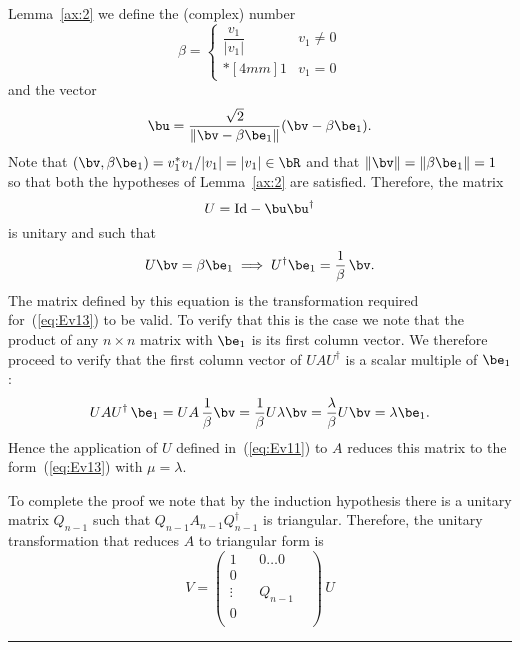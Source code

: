 Lemma~\ref{ax:2} we define the (complex) number
%
\begin{equation*}
  \beta =
  \begin{cases}
    \dfrac{v_1}{|v_1|} & v_1 \neq 0 \\*[4mm] 1 & v_1 = 0
  \end{cases}
\end{equation*}
%
and the vector
%
\begin{equation*}
  \bu = \frac{\sqrt{2}}{\|\bv - \beta \be_1\|} (\bv - \beta \be_1) .
\end{equation*}
%
Note that $(\bv, \beta \be_1) = v_1^{*} v_1/|v_1|=|v_1| \in \bR$ and
that $\|\bv\| = \|\beta \be_1\| = 1$ so that both the hypotheses of
Lemma~\ref{ax:2} are satisfied.  Therefore, the matrix
%
\begin{equation}
  U = \text{Id} - \bu \bu^{\dagger}
  \label{eq:Ev11}
\end{equation}
%
is unitary and such that
%
\begin{equation}
  U \bv = \beta \be_1 \implies U^{\dagger} \be_1 = \frac{1}{\beta} \, \bv .
  \label{eq:Ev12}
\end{equation}
%
The matrix defined by this equation is the transformation required
for~(\ref{eq:Ev13}) to be valid.  To verify that this is the case we
note that the product of any $n \times n$ matrix with $\be_1$ is its
first column vector.  We therefore proceed to verify that the first
column vector of $U A U^{\dagger}$ is a scalar multiple of $\be_1$:
%
\begin{equation*}
  U A U^{\dagger} \, \be_1 = U A \, \frac{1}{\beta} \bv =
  \frac{1}{\beta} U \lambda \bv = \frac{\lambda}{\beta} U \bv =
  \lambda \be_1 .
\end{equation*}
%
Hence the application of $U$ defined in~(\ref{eq:Ev11}) to $A$ reduces
this matrix to the form~(\ref{eq:Ev13}) with $\mu = \lambda$.

To complete the proof we note that by the induction hypothesis there
is a unitary matrix $Q_{n-1}$ such that $Q_{n-1} A_{n-1}
Q^{\dagger}_{n-1}$ is triangular.  Therefore, the unitary
transformation that reduces $A$ to triangular form is
%
\begin{equation*}
  V =
  \left ( \begin{array}{c|ccc}
      1 & & 0 \ldots 0 & \\ \hline
      0 & & & \\
      \vdots & & Q_{n-1} & \\
      0 & & & \\
    \end{array} \right ) \, U
\end{equation*}
\null \hfill \rule{3mm}{3mm}


